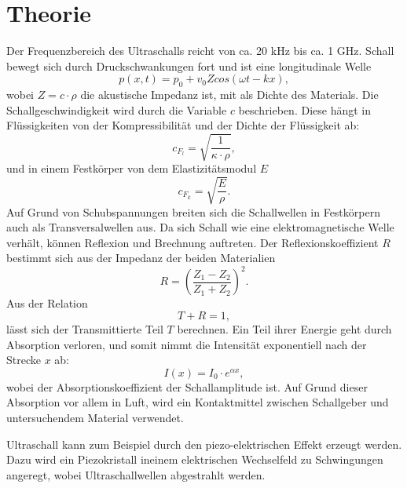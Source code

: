 

\section{Theorie}
\label{sec:Theorie}

Der Frequenzbereich des Ultraschalls reicht von ca. 20 \si{\kilo\hertz} bis ca. 1 \si{\giga\hertz}.
Schall bewegt sich durch Druckschwankungen fort und ist eine longitudinale Welle
\begin{equation}
p(x,t) = p_0 + v_0 Z cos(\omega t - kx) ,
\end{equation}
wobei $Z = c \cdot \rho $ die akustische Impedanz ist, mit \rho als Dichte des Materials.
Die Schallgeschwindigkeit wird durch die Variable $c$ beschrieben.
Diese hängt in Flüssigkeiten von der Kompressibilität \kappa und der Dichte \rho der Flüssigkeit ab:
\begin{equation}
c_{F_l} = \sqrt{\frac{1}{\kappa \cdot \rho}} ,
\end{equation}
und in einem Festkörper von dem Elastizitätsmodul $E$
\begin{equation}
c_{F_k} = \sqrt{\frac{E}{\rho}} .
\end{equation}
Auf Grund von Schubspannungen breiten sich die Schallwellen in Festkörpern auch als Transversalwellen aus.
Da sich Schall wie eine elektromagnetische Welle verhält, können Reflexion und Brechnung auftreten.
Der Reflexionskoeffizient $R$ bestimmt sich aus der Impedanz der beiden Materialien
\begin{equation}
R = (\frac{Z_1 - Z_2}{Z_1 + Z_2})^2 .
\end{equation}
Aus der Relation
\begin{equation}
T + R = 1 ,
\end{equation}
lässt sich der Transmittierte Teil $T$ berechnen.
Ein Teil ihrer Energie geht durch Absorption verloren, und somit nimmt die Intensität exponentiell nach der Strecke $x$ ab:
\begin{equation}
I(x) = I_0 \cdot e^{\alpha x} ,
\end{equation}
wobei \alpha der Absorptionskoeffizient der Schallamplitude ist. Auf Grund dieser Absorption vor allem in Luft, wird ein Kontaktmittel zwischen Schallgeber und untersuchendem Material verwendet.

Ultraschall kann zum Beispiel durch den piezo-elektrischen Effekt erzeugt werden. 
Dazu wird ein Piezokristall ineinem elektrischen Wechselfeld zu Schwingungen angeregt, wobei Ultraschallwellen abgestrahlt werden.

